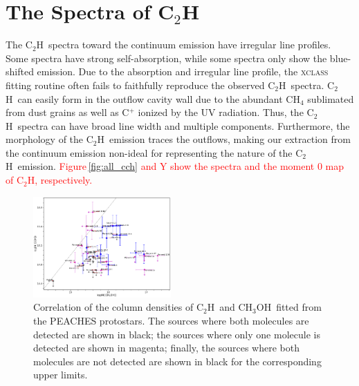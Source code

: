 \documentclass[twocolumn]{aastex62}
\newcommand{\methanol}{\mbox{CH$_{3}$OH}}
\newcommand{\cch}{\mbox{C$_2$H}}
\begin{document}
\section{The Spectra of \cch}
The \cch\ spectra toward the continuum emission have irregular line profiles.  Some spectra have strong self-absorption, while some spectra only show the blue-shifted emission.  Due to the absorption and irregular line profile, the \textsc{xclass} fitting routine often fails to faithfully reproduce the observed \cch\ spectra.  \cch\ can easily form in the outflow cavity wall due to the abundant CH$_{4}$ sublimated from dust grains as well as C$^+$ ionized by the UV radiation.  Thus, the \cch\ spectra can have broad line width and multiple components.  Furthermore, the morphology of the \cch\ emission traces the outflows, making our extraction from the continuum emission non-ideal for representing the nature of the \cch\ emission.  \textcolor{red}{Figure\,\ref{fig:all_cch} and Y show the spectra and the moment 0 map of \cch, respectively.}

\begin{figure}[htbp!]
  \centering
  \includegraphics[width=0.47\textwidth]{Ncol_ch3oh_cch.pdf}
  \caption{Correlation of the column densities of \cch\ and \methanol\ fitted from the PEACHES protostars.  The sources where both molecules are detected are shown in black; the sources where only one molecule is detected are shown in magenta; finally, the sources where both molecules are not detected are shown in black for the corresponding upper limits.}
  \label{fig:cch_ch3oh}
\end{figure}
\end{document}
